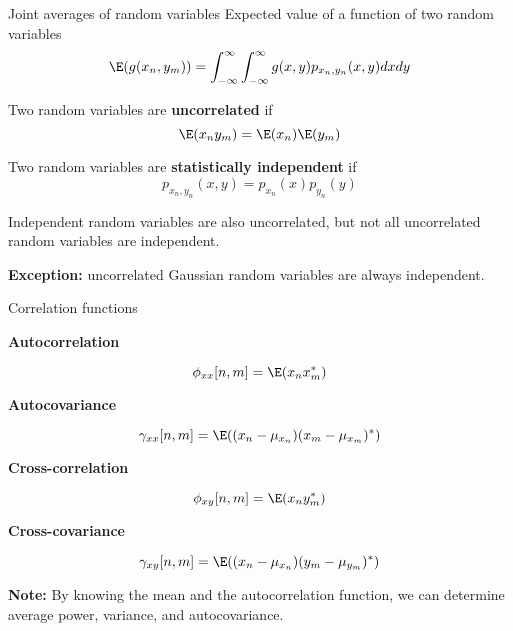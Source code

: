 \documentclass[10pt, aspectratio=169]{beamer}
\begin{document}
\begin{frame}{Joint averages of random variables}
Expected value of a function of two random variables
\begin{equation*}
\E(g(x_n,y_m)) = \int_{-\infty}^{\infty}\int_{-\infty}^{\infty}g(x, y)p_{x_n, y_n}(x, y)dxdy
\end{equation*}

\pause
Two random variables are \textbf{uncorrelated} if
\begin{equation*}
\E(x_ny_m) = \E(x_n)\E(y_m)
\end{equation*}

\pause
Two random variables are \textbf{statistically independent} if
\begin{equation*}
p_{x_n, y_n}(x,y) = p_{x_n}(x)p_{y_n}(y)
\end{equation*}

Independent random variables are also uncorrelated, but not all uncorrelated random variables are independent.

\textbf{Exception:} uncorrelated Gaussian random variables are always independent.
\end{frame}

\begin{frame}{Correlation functions}

\textbf{Autocorrelation}

\begin{equation*}
\phi_{xx}[n, m] = \E(x_nx_m^*) 
\end{equation*}

\textbf{Autocovariance}

\begin{equation*}
\gamma_{xx}[n, m] = \E((x_n-\mu_{x_n})(x_m - \mu_{x_m})^*) 
\end{equation*}

\textbf{Cross-correlation}

\begin{equation*}
\phi_{xy}[n, m] = \E(x_ny_m^*) 
\end{equation*}

\textbf{Cross-covariance}

\begin{equation*}
\gamma_{xy}[n, m] = \E((x_n-\mu_{x_n})(y_m - \mu_{y_m})^*) 
\end{equation*}

\textbf{Note:} By knowing the mean and the autocorrelation function, we can determine average power, variance, and autocovariance.

\end{frame}
\end{document}
